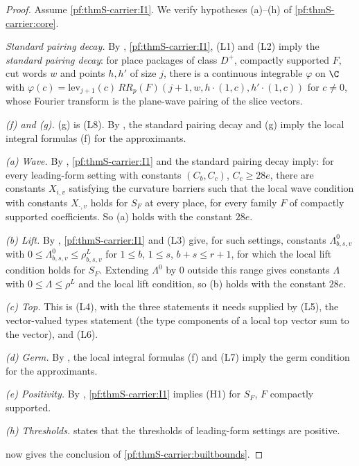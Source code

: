 \begin{proof}
Assume \ref{pf:thmS-carrier:I1}. We verify hypotheses (a)--(h) of \cref{pf:thmS-carrier:core}.

\emph{Standard pairing decay.} By , \ref{pf:thmS-carrier:I1},
(L1) and (L2) imply the \emph{standard pairing decay}: for place packages of class $D^+$, compactly supported $F$, cut words $w$
and points $h,h'$ of size $j$, there is a continuous integrable $\varphi$ on $\C$ with $\varphi(c)=\mathrm{lev}_{j+1}(c)\,
RR_p(F)(j+1,w,h\cdot(1,c),h'\cdot(1,c))$ for $c\ne0$, whose Fourier transform is the plane-wave pairing of the slice vectors.

\emph{(f) and (g).} (g) is (L8). By , the standard pairing decay
and (g) imply the local integral formulas (f) for the approximants.

\emph{(a) Wave.} By , \ref{pf:thmS-carrier:I1} and
the standard pairing decay imply: for every leading-form setting with constants $(C_b,C_c)$, $C_c\ge28e$, there are constants
$X_{i,v}$ satisfying the curvature barriers such that the local wave condition with constants $X_{\cdot,v}$ holds for $S_F$ at
every place, for every family $F$ of compactly supported coefficients. So (a) holds with the constant $28e$.

\emph{(b) Lift.} By , \ref{pf:thmS-carrier:I1} and
(L3) give, for such settings, constants $\Lambda^0_{b,s,v}$ with $0\le\Lambda^0_{b,s,v}\le\rho^L_{b,s,v}$ for $1\le b$, $1\le s$,
$b+s\le r+1$, for which the local lift condition holds for $S_F$. Extending $\Lambda^0$ by $0$ outside this range gives
constants $\Lambda$ with $0\le\Lambda\le\rho^L$ and the local lift condition, so (b) holds with the constant $28e$.

\emph{(c) Top.} This is (L4), with the three statements it needs supplied by (L5), the vector-valued types statement
 (the type components of a local top vector sum to the vector), and
(L6).

\emph{(d) Germ.} By , the local integral formulas (f) and (L7) imply
the germ condition for the approximants.

\emph{(e) Positivity.} By , \ref{pf:thmS-carrier:I1} implies (H1) for
$S_F$, $F$ compactly supported.

\emph{(h) Thresholds.}  states that the thresholds of leading-form
settings are positive.

 now gives the conclusion of \cref{pf:thmS-carrier:builtbounds}.
\end{proof}

